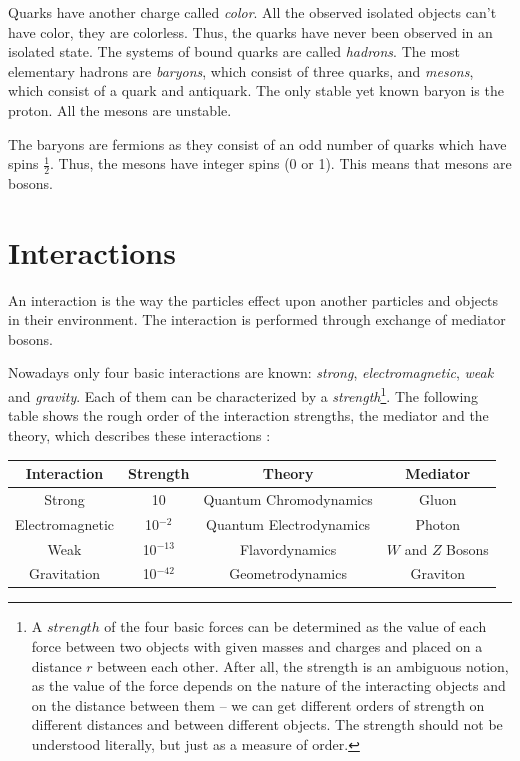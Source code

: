 Quarks have another charge called \textit{color}. All the observed isolated objects can't have color, they are colorless. Thus, the 
quarks have never been observed in an isolated state. The systems of bound quarks are called \textit{hadrons}. The most elementary hadrons are 
\textit{baryons}, which consist of three quarks, and \textit{mesons}, which consist of a quark and antiquark. The only stable yet known baryon 
is the proton. All the mesons are unstable.

The baryons are fermions as they consist of an odd number of quarks which have spins $\frac{1}{2}$. Thus, the mesons have integer spins
(0 or 1). This means that mesons are bosons.

\section{Interactions}

An interaction is the way the particles effect upon another particles and objects in their environment. The interaction is performed through exchange
of mediator bosons.

Nowadays only four basic interactions are known: \textit{strong}, \textit{electromagnetic}, \textit{weak} and \textit{gravity}. 
Each of them can be characterized by a \textit{strength}\footnote{A $strength$\cite{griffiths2008introduction} of the four basic forces can be determined as the value of each force
between two objects with given masses and charges and placed on a distance $r$ between each other. After all, the strength is an ambiguous notion, as the 
value of the force depends on the nature of the interacting objects and on the distance between them -- we can get different orders of strength on different
distances  and between different objects. The strength should not be understood literally, but just as a measure of order.}.
The following table shows the rough order of the interaction strengths, the mediator
and the theory, which describes these interactions \cite{griffiths2008introduction}:

\begin{center}\label{tab:forces}
  \begin{tabular}{ | c | c | c | c | }
    \hline
    \textbf{Interaction} & \textbf{Strength} & \textbf{Theory} & \textbf{Mediator} \\ \hline \hline
    Strong & 10 & Quantum Chromodynamics & Gluon \\ \hline 
    Electromagnetic & 10$^{-2}$ & Quantum Electrodynamics & Photon \\ \hline
    Weak & 10$^{-13}$ & Flavordynamics & $W$ and $Z$ Bosons \\ \hline
    Gravitation & 10$^{-42}$ & Geometrodynamics & Graviton \\
    \hline
  \end{tabular}
\end{center}

